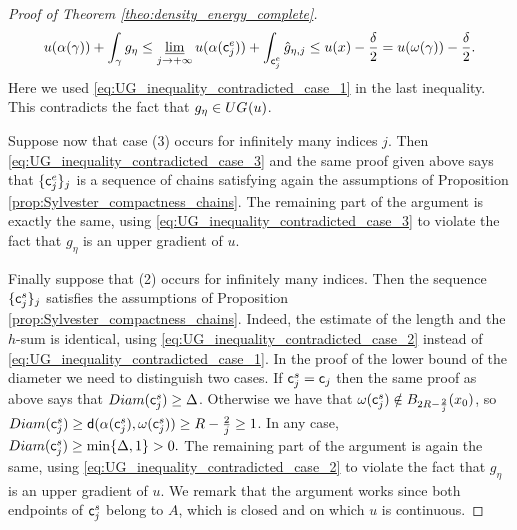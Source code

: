 \documentclass[12pt]{amsart}
\newcommand{\sfd}{{\sf d}}
\newcommand{\limi}{\varliminf}
\theoremstyle{definition}
\newcommand{\sfc}{{\sf c}}
\newcommand{\UG}[1]{{\rm UG}^{#1}}
\begin{document}
\begin{proof}[Proof of Theorem \ref{theo:density_energy_complete}]
    \begin{equation}
        \begin{aligned}
            u(\alpha(\gamma)) + \int_\gamma g_\eta \le \limi_{j\to +\infty} u(\alpha(\sfc_j^e)) + \int_{\sfc_j^e} \hat{g}_{\eta,j} \le
            u(x) - \frac{\delta}{2} = u(\omega(\gamma)) - \frac{\delta}{2}.
        \end{aligned}
    \end{equation}
    Here we used \eqref{eq:UG_inequality_contradicted_case_1} in the last inequality.
    This contradicts the fact that $g_\eta \in \UG{}(u)$.

    Suppose now that case (3) occurs for infinitely many indices $j$. Then \eqref{eq:UG_inequality_contradicted_case_3} and the same proof given above says that $\{\sfc_j^e\}_j$ is a sequence of chains satisfying again the assumptions of Proposition \ref{prop:Sylvester_compactness_chains}. The remaining part of the argument is exactly the same, using \eqref{eq:UG_inequality_contradicted_case_3} to violate the fact that $g_\eta$ is an upper gradient of $u$.

    Finally suppose that (2) occurs for infinitely many indices. Then the sequence $\{\sfc_j^s\}_j$ satisfies the assumptions of Proposition \ref{prop:Sylvester_compactness_chains}. Indeed, the estimate of the length and the $h$-sum is identical, using \eqref{eq:UG_inequality_contradicted_case_2} instead of \eqref{eq:UG_inequality_contradicted_case_1}. In the proof of the lower bound of the diameter we need to distinguish two cases. If $\sfc_j^s = \sfc_j$ then the same proof as above says that ${\rm Diam}(\sfc_j^s) \ge \Delta$. Otherwise we have that $\omega(\sfc_j^s) \notin B_{2R-\frac{2}{j}}(x_0)$, so ${\rm Diam}(\sfc_j^s) \ge \sfd(\alpha(\sfc_j^s), \omega(\sfc_j^s)) \ge R - \frac{2}{j} \ge 1$. In any case, ${\rm Diam}(\sfc_j^s) \ge \min\{\Delta, 1\} > 0.$    
    The remaining part of the argument is again the same, using \eqref{eq:UG_inequality_contradicted_case_2} to violate the fact that $g_\eta$ is an upper gradient of $u$. We remark that the argument works since both endpoints of $\sfc_j^s$ belong to $A$, which is closed and on which $u$ is continuous.
    \vspace{2mm}


\end{proof}
\end{document}
